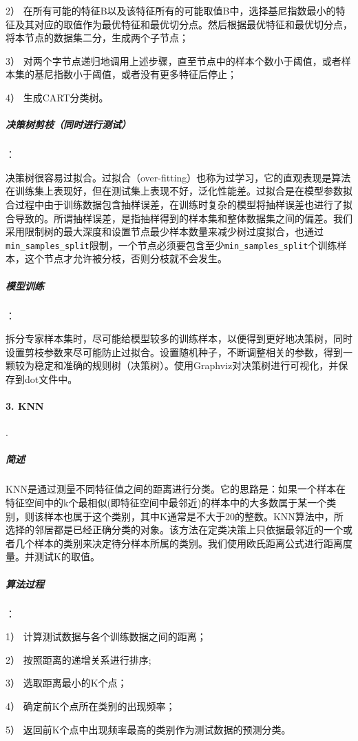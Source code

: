 \documentclass[lang=cn,12pt]{elegantpaper}
\begin{document}
2） 在所有可能的特征B以及该特征所有的可能取值B中，选择基尼指数最小的特征及其对应的取值作为最优特征和最优切分点。然后根据最优特征和最优切分点，将本节点的数据集二分，生成两个子节点；

3） 对两个字节点递归地调用上述步骤，直至节点中的样本个数小于阈值，或者样本集的基尼指数小于阈值，或者没有更多特征后停止；

4） 生成CART分类树。

\subparagraph{决策树剪枝（同时进行测试）}：

决策树很容易过拟合。过拟合（over-fitting）也称为过学习，它的直观表现是算法在训练集上表现好，但在测试集上表现不好，泛化性能差。过拟合是在模型参数拟合过程中由于训练数据包含抽样误差，在训练时复杂的模型将抽样误差也进行了拟合导致的。所谓抽样误差，是指抽样得到的样本集和整体数据集之间的偏差。我们采用限制树的最大深度和设置节点最少样本数量来减少树过度拟合，也通过\lstinline{min_samples_split}限制，一个节点必须要包含至少\lstinline{min_samples_split}个训练样本，这个节点才允许被分枝，否则分枝就不会发生。

\subparagraph{模型训练}：

拆分专家样本集时，尽可能给模型较多的训练样本，以便得到更好地决策树，同时设置剪枝参数来尽可能防止过拟合。设置随机种子，不断调整相关的参数，得到一颗较为稳定和准确的规则树（决策树）。使用Graphviz对决策树进行可视化，并保存到dot文件中。



\paragraph{3. KNN}.

\subparagraph{简述}

KNN\cite{统计学习方法}是通过测量不同特征值之间的距离进行分类。它的思路是：如果一个样本在特征空间中的k个最相似(即特征空间中最邻近)的样本中的大多数属于某一个类别，则该样本也属于这个类别，其中K通常是不大于20的整数。KNN算法中，所选择的邻居都是已经正确分类的对象。该方法在定类决策上只依据最邻近的一个或者几个样本的类别来决定待分样本所属的类别。我们使用欧氏距离公式进行距离度量。并测试K的取值。

\subparagraph{算法过程}：

1） 计算测试数据与各个训练数据之间的距离；

2） 按照距离的递增关系进行排序;

3） 选取距离最小的K个点；

4） 确定前K个点所在类别的出现频率；

5） 返回前K个点中出现频率最高的类别作为测试数据的预测分类。
\end{document}
